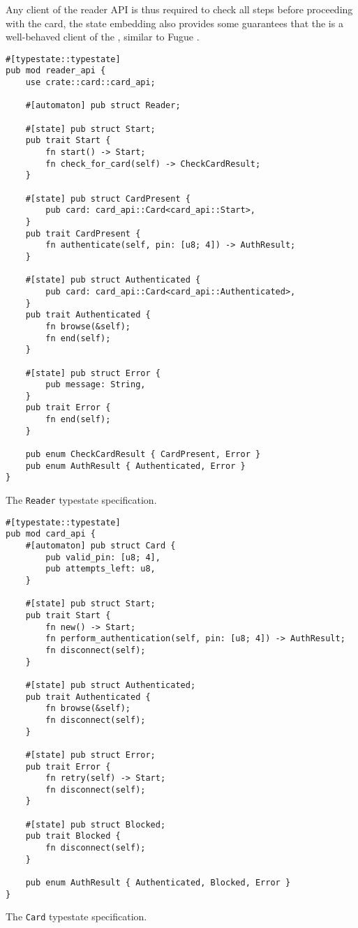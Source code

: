 Any client of the reader API is thus required to check all steps before proceeding with the card,
the state embedding also provides some guarantees that the  is a well-behaved client of the ,
similar to Fugue \autocite{DeLine2004}.

\begin{listing}
    \begin{verbatim}
#[typestate::typestate]
pub mod reader_api {
    use crate::card::card_api;

    #[automaton] pub struct Reader;

    #[state] pub struct Start;
    pub trait Start {
        fn start() -> Start;
        fn check_for_card(self) -> CheckCardResult;
    }

    #[state] pub struct CardPresent {
        pub card: card_api::Card<card_api::Start>,
    }
    pub trait CardPresent {
        fn authenticate(self, pin: [u8; 4]) -> AuthResult;
    }

    #[state] pub struct Authenticated {
        pub card: card_api::Card<card_api::Authenticated>,
    }
    pub trait Authenticated {
        fn browse(&self);
        fn end(self);
    }

    #[state] pub struct Error {
        pub message: String,
    }
    pub trait Error {
        fn end(self);
    }

    pub enum CheckCardResult { CardPresent, Error }
    pub enum AuthResult { Authenticated, Error }
}
    \end{verbatim}
    \caption{The \texttt{Reader} typestate specification.}
    \label{lst:typestate-reader}
\end{listing}

\begin{listing}
    \begin{verbatim}
#[typestate::typestate]
pub mod card_api {
    #[automaton] pub struct Card {
        pub valid_pin: [u8; 4],
        pub attempts_left: u8,
    }

    #[state] pub struct Start;
    pub trait Start {
        fn new() -> Start;
        fn perform_authentication(self, pin: [u8; 4]) -> AuthResult;
        fn disconnect(self);
    }

    #[state] pub struct Authenticated;
    pub trait Authenticated {
        fn browse(&self);
        fn disconnect(self);
    }

    #[state] pub struct Error;
    pub trait Error {
        fn retry(self) -> Start;
        fn disconnect(self);
    }

    #[state] pub struct Blocked;
    pub trait Blocked {
        fn disconnect(self);
    }

    pub enum AuthResult { Authenticated, Blocked, Error }
}
    \end{verbatim}
    \caption{The \texttt{Card} typestate specification.}
    \label{lst:typestate-card}
\end{listing}


